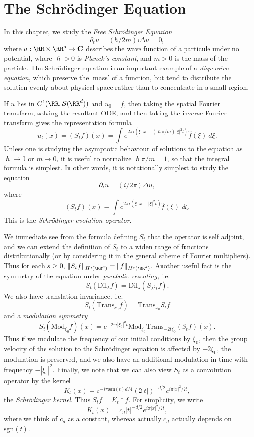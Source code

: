 \chapter{The Schr\"{o}dinger Equation}

In this chapter, we study the \emph{Free Schr\"{o}dinger Equation}
%
\[ \partial_t u = (\hbar / 2m) i \Delta u = 0, \]
%
where $u: \RR \times \RR^d \to \mathbf{C}$ describes the wave function of a particule under no potential, where $\hslash > 0$ is \emph{Planck's constant}, and $m > 0$ is the mass of the particle. The Schr\"{o}dinger equation is an important example of a \emph{dispersive equation}, which preserve the `mass' of a function, but tend to distribute the solution evenly about physical space rather than to concentrate in a small region.

If $u$ lies in $C^1(\RR,\mathcal{S}(\RR^d))$ and $u_0 = f$, then taking the spatial Fourier transform, solving the resultant ODE, and then taking the inverse Fourier transform gives the representation formula
%
\[ u_t(x) = (S_t f)(x) = \int e^{2 \pi i (\xi \cdot x - (\hslash \pi / m) |\xi|^2 t)} \widehat{f}(\xi)\; d\xi. \]
%
Unless one is studying the asymptotic behaviour of solutions to the equation as $\hslash \to 0$ or $m \to 0$, it is useful to normalize $\hslash \pi / m = 1$, so that the integral formula is simplest. In other words, it is notationally simplest to study the equation
%
\[ \partial_t u = (i/2\pi) \Delta u, \]
%
where
%
\[ (S_t f)(x) = \int e^{2 \pi i (\xi \cdot x - |\xi|^2 t)} \widehat{f}(\xi)\; d\xi. \]
%
This is the \emph{Schr\"{o}dinger evolution operator}.

We immediate see from the formula defining $S_t$ that the operator is self adjoint, and we can extend the definition of $S_t$ to a widen range of functions distributionally (or by considering it in the general scheme of Fourier multipliers). Thus for each $s \geq 0$, $\| S_t f \|_{H^s(\RR^d)} = \| f \|_{H^s(\RR^d)}$. Another useful fact is the symmetry of the equation under \emph{parabolic rescaling}, i.e.
%
\[ S_t(\text{Dil}_\lambda f) = \text{Dil}_\lambda (S_{\lambda^2 t} f). \]
%
We also have translation invariance, i.e.
%
\[ S_t(\text{Trans}_{x_0} f) = \text{Trans}_{x_0} S_t f \]
%
and a \emph{modulation symmetry}
%
\[ S_t(\text{Mod}_{\xi_0} f)(x) = e^{-2 \pi i |\xi_0|^2 t} \text{Mod}_{\xi_0} \text{Trans}_{-2t \xi_0} (S_t f)(x). \]
%
Thus if we modulate the frequency of our initial conditions by $\xi_0$, then the group velocity of the solution to the Schr\"{o}dinger equation is affected by $-2\xi_0$, the modulation is preserved, and we also have an additional modulation in time with frequency $-|\xi_0|^2$. Finally, we note that we can also view $S_t$ as a convolution operator by the kernel
%
\[ K_t(x) = e^{- i \pi \text{sgn}(t) d/4} (2|t|)^{-d/2} e^{i \pi |x|^2/2t}, \]
%
the \emph{Schr\"{o}dinger kernel}. Thus $S_t f = K_t * f$. For simplicity, we write
%
\[ K_t(x) = c_d |t|^{-d/2} e^{i \pi |x|^2/2t}, \]
%
where we think of $c_d$ as a constant, whereas actually $c_d$ actually depends on $\text{sgn}(t)$.

